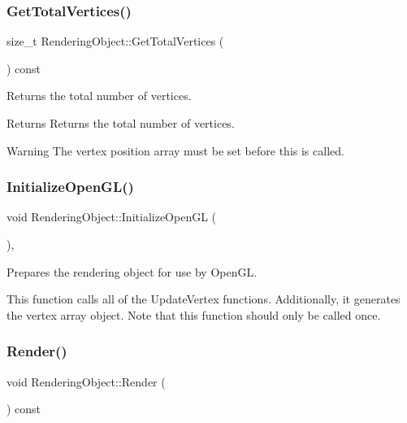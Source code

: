 \subsubsection{\texorpdfstring{Get\+Total\+Vertices()}{GetTotalVertices()}}
{\footnotesize\ttfamily size\+\_\+t Rendering\+Object\+::\+Get\+Total\+Vertices (\begin{DoxyParamCaption}{ }\end{DoxyParamCaption}) const\hspace{0.3cm}{\ttfamily [inline]}}



Returns the total number of vertices. 

\begin{DoxyReturn}{Returns}
Returns the total number of vertices. 
\end{DoxyReturn}
\begin{DoxyWarning}{Warning}
The vertex position array must be set before this is called. 
\end{DoxyWarning}
\hypertarget{class_rendering_object_a77c78d1b42ea2ebfdbf994b6b91ce805}{}\label{class_rendering_object_a77c78d1b42ea2ebfdbf994b6b91ce805} 
\subsubsection{\texorpdfstring{Initialize\+Open\+G\+L()}{InitializeOpenGL()}}
{\footnotesize\ttfamily void Rendering\+Object\+::\+Initialize\+Open\+GL (\begin{DoxyParamCaption}{ }\end{DoxyParamCaption})\hspace{0.3cm}{\ttfamily [protected]}, {\ttfamily [virtual]}}



Prepares the rendering object for use by Open\+GL. 

This function calls all of the Update\+Vertex functions. Additionally, it generates the vertex array object. Note that this function should only be called once. \hypertarget{class_rendering_object_aee6affd69495adc61bae0e71433d353a}{}\label{class_rendering_object_aee6affd69495adc61bae0e71433d353a} 
\subsubsection{\texorpdfstring{Render()}{Render()}}
{\footnotesize\ttfamily void Rendering\+Object\+::\+Render (\begin{DoxyParamCaption}{ }\end{DoxyParamCaption}) const\hspace{0.3cm}{\ttfamily [virtual]}}



